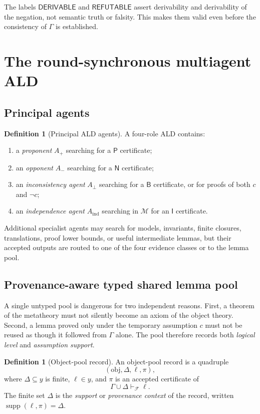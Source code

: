 \documentclass[11pt]{article}
\theoremstyle{definition}
\newtheorem{definition}[theorem]{Definition}
\theoremstyle{remark}
\newcommand{\Der}{\mathsf{DERIVABLE}}
\newcommand{\Refut}{\mathsf{REFUTABLE}}
\newcommand{\Supp}{\operatorname{supp}}
\newcommand{\Plus}{\mathsf{P}}
\newcommand{\Minus}{\mathsf{N}}
\newcommand{\BotEv}{\mathsf{B}}
\newcommand{\IndEv}{\mathsf{I}}
\newcommand{\M}{\mathcal M}
\newcommand{\F}{\mathcal F}
\newcommand{\Gammaa}{\Gamma}
\begin{document}
The labels $\Der$ and $\Refut$ assert derivability and derivability of the negation, not semantic truth or falsity. This makes them valid even before the consistency of $\Gammaa$ is established.

\section{The round-synchronous multiagent ALD}

\subsection{Principal agents}
\begin{definition}[Principal ALD agents]
A four-role ALD contains:
\begin{enumerate}[label=(\arabic*)]
  \item a \emph{proponent} $A_{+}$ searching for a $\Plus$ certificate;
  \item an \emph{opponent} $A_{-}$ searching for a $\Minus$ certificate;
  \item an \emph{inconsistency agent} $A_{\bot}$ searching for a $\BotEv$ certificate, or for proofs of both $c$ and $\neg c$;
  \item an \emph{independence agent} $A_{\mathrm{ind}}$ searching in $\M$ for an $\IndEv$ certificate.
\end{enumerate}
Additional specialist agents may search for models, invariants, finite closures, translations, proof lower bounds, or useful intermediate lemmas, but their accepted outputs are routed to one of the four evidence classes or to the lemma pool.
\end{definition}

\subsection{Provenance-aware typed shared lemma pool}
A single untyped pool is dangerous for two independent reasons. First, a theorem of the metatheory must not silently become an axiom of the object theory. Second, a lemma proved only under the temporary assumption $c$ must not be reused as though it followed from $\Gammaa$ alone. The pool therefore records both \emph{logical level} and \emph{assumption support}.

\begin{definition}[Object-pool record]
An object-pool record is a quadruple
\[
(\mathrm{obj},\Delta,\ell,\pi),
\]
where $\Delta\subseteq y$ is finite, $\ell\in y$, and $\pi$ is an accepted certificate of
\[
\Gammaa\cup\Delta\vdash_{\F}\ell.
\]
The finite set $\Delta$ is the \emph{support} or \emph{provenance context} of the record, written $\Supp(\ell,\pi)=\Delta$.
\end{definition}
\end{document}
